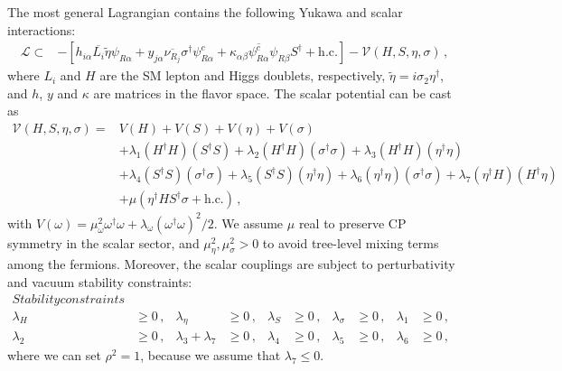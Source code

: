 \documentclass[12pt]{article}
\begin{document}
The most general Lagrangian contains the following Yukawa and scalar interactions:
%
\begin{align*}
\label{Eq:LagY}
    \mathcal{L} \subset& -[ 
    h_{i\alpha} \overline{L_{i}} \tilde{\eta} \psi_{R\alpha} +  y_{j\alpha} \overline{\nu_{R_{j}}} \sigma^{\dagger} \psi^c_{R\alpha} + \kappa_{\alpha\beta} \overline{\psi^{c}_{R\alpha}} \psi_{R\beta} S^\dagger + \text{h.c.}] - \mathcal{V}(H, S, \eta, \sigma)\,,
\end{align*}
%
where $L_{i}$ and $H$ are the SM lepton and Higgs doublets, respectively,  $\widetilde{\eta} = i \sigma_2 \eta^{\dagger}$, and $h$, $y$ and $\kappa$ are matrices in the flavor space. 
The scalar potential can be cast as
%
\begin{align*}
    \mathcal{V}(H, S, \eta, \sigma) = & V(H) + V(S) + V(\eta) + V(\sigma) \\
    &+  \lambda_{1} (H^{\dagger} H ) (S^{\dagger} S) + \lambda_{2} (H^{\dagger} H ) (\sigma^{\dagger} \sigma ) + \lambda_{3} (H^{\dagger} H ) (\eta^{\dagger} \eta )\\
    &+ \lambda_{4} (S^{\dagger} S) (\sigma^{\dagger} \sigma ) + \lambda_{5} (S^{\dagger} S) (\eta^{\dagger} \eta ) + \lambda_{6} (\eta^{\dagger} \eta ) (\sigma^{\dagger} \sigma ) + \lambda_{7} (\eta^{\dagger} H ) (H^{\dagger} \eta ) \\
    &+ \mu (\eta^{\dagger} H S^{\dagger} \sigma + \text{h.c.})\,,
\end{align*}
%
with $V(\omega) = \mu^{2}_{\omega} \omega^{\dagger} \omega + \lambda_{\omega} (\omega^{\dagger} \omega)^{2}/2$. We assume $\mu$ real to preserve CP symmetry in the scalar sector, and $\mu^2_\eta,\mu^2_\sigma>0$ to avoid tree-level mixing terms among the fermions. Moreover, the scalar couplings are subject to perturbativity and vacuum stability constraints:
\begin{align*}
Stability constraints\\
\lambda_{H} &\geq 0\,, & \lambda_{\eta} &\geq 0\,, & \lambda_{S} &\geq 0\,, & \lambda_{\sigma} &\geq 0\,, & \lambda_{1} &\geq 0\,, & \\
\lambda_{2} &\geq 0\,, &
\lambda_{3}+\lambda_{7} &\geq 0\,, & \lambda_{4} &\geq 0\,, & \lambda_{5} &\geq 0\,, & \lambda_{6} &\geq 0\,,
\end{align*}
where we can set $\rho^{2} = 1$, because we assume that $\lambda_{7} \leq 0$.
\end{document}
